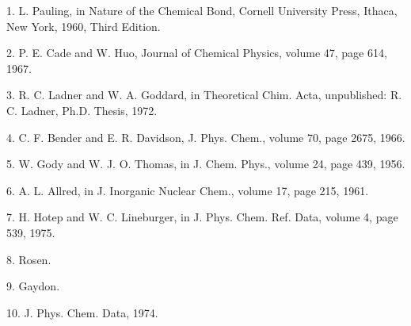 
\bigskip


\item{1.}  L. Pauling, in Nature of the Chemical Bond, Cornell University Press,
Ithaca, New York, 1960, Third Edition.

\item{2.} P. E. Cade and W. Huo, Journal of Chemical Physics, volume 47, page
614, 1967.

\item{3.} R. C. Ladner and W. A. Goddard, in Theoretical Chim. Acta, 
unpublished: R. C. Ladner, Ph.D. Thesis, 1972.

\item{4.} C. F. Bender and E. R. Davidson, J. Phys. Chem., volume 70, page
2675, 1966.

\item{5.} W. Gody and W. J. O. Thomas, in J. Chem. Phys., volume 24, page
439, 1956.

\item{6.} A. L. Allred, in J. Inorganic Nuclear Chem., volume 17, page 
215, 1961.

\item{7.} H. Hotep and W. C. Lineburger, in J. Phys. Chem. Ref. Data, volume
4, page 539, 1975.

\item{8.} Rosen.

\item{9.} Gaydon.

\item{10.} J. Phys. Chem. Data, 1974.
\vfill\eject

\baselineskip=12pt
